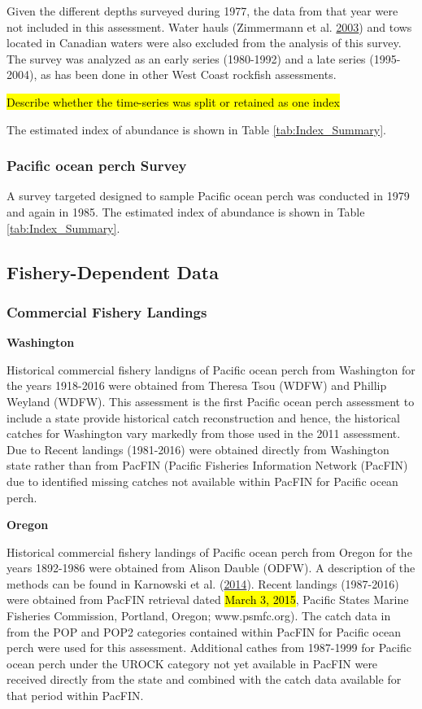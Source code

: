 \documentclass[12pt,]{article}
\begin{document}
Given the different depths surveyed during 1977, the data from that year
were not included in this assessment. Water hauls (Zimmermann et al.
\protect\hyperlink{ref-zimmermann_influence_2003}{2003}) and tows
located in Canadian waters were also excluded from the analysis of this
survey. The survey was analyzed as an early series (1980-1992) and a
late series (1995-2004), as has been done in other West Coast rockfish
assessments.

\hl{Describe whether the time-series was split or retained as one index}

The estimated index of abundance is shown in Table
\ref{tab:Index_Summary}.

\subsubsection{Pacific ocean perch
Survey}\label{pacific-ocean-perch-survey}

A survey targeted designed to sample Pacific ocean perch was conducted
in 1979 and again in 1985. The estimated index of abundance is shown in
Table \ref{tab:Index_Summary}.

\subsection{Fishery-Dependent Data}\label{fishery-dependent-data}

\subsubsection{Commercial Fishery
Landings}\label{commercial-fishery-landings}

\textbf{Washington}

Historical commercial fishery landigns of Pacific ocean perch from
Washington for the years 1918-2016 were obtained from Theresa Tsou
(WDFW) and Phillip Weyland (WDFW). This assessment is the first Pacific
ocean perch assessment to include a state provide historical catch
reconstruction and hence, the historical catches for Washington vary
markedly from those used in the 2011 assessment. Due to Recent landings
(1981-2016) were obtained directly from Washington state rather than
from PacFIN (Pacific Fisheries Information Network (PacFIN) due to
identified missing catches not available within PacFIN for Pacific ocean
perch.

\textbf{Oregon}

Historical commercial fishery landings of Pacific ocean perch from
Oregon for the years 1892-1986 were obtained from Alison Dauble (ODFW).
A description of the methods can be found in Karnowski et al.
(\protect\hyperlink{ref-karnowski_historical_2014}{2014}). Recent
landings (1987-2016) were obtained from PacFIN retrieval dated
\hl{March 3, 2015}, Pacific States Marine Fisheries Commission,
Portland, Oregon; www.psmfc.org). The catch data in from the POP and
POP2 categories contained within PacFIN for Pacific ocean perch were
used for this assessment. Additional cathes from 1987-1999 for Pacific
ocean perch under the UROCK category not yet available in PacFIN were
received directly from the state and combined with the catch data
available for that period within PacFIN.
\end{document}
